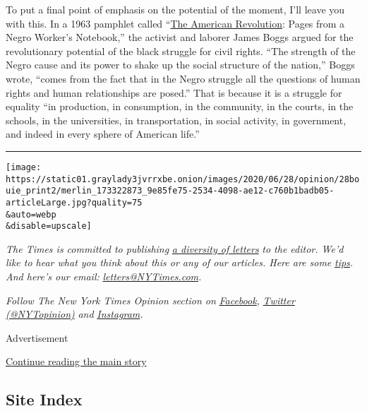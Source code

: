 To put a final point of emphasis on the potential of the moment, I'll
leave you with this. In a 1963 pamphlet called
``\href{https://books.google.com/books/about/The_American_revolution.html?id=p2MOAQAAMAAJ}{The
American Revolution}: Pages from a Negro Worker's Notebook,'' the
activist and laborer James Boggs argued for the revolutionary potential
of the black struggle for civil rights. ``The strength of the Negro
cause and its power to shake up the social structure of the nation,''
Boggs wrote, ``comes from the fact that in the Negro struggle all the
questions of human rights and human relationships are posed.'' That is
because it is a struggle for equality ``in production, in consumption,
in the community, in the courts, in the schools, in the universities, in
transportation, in social activity, in government, and indeed in every
sphere of American life.''

\begin{center}\rule{0.5\linewidth}{\linethickness}\end{center}

\texttt{[image: https://static01.graylady3jvrrxbe.onion/images/2020/06/28/opinion/28bouie\_print2/merlin\_173322873\_9e85fe75-2534-4098-ae12-c760b1badb05-articleLarge.jpg?quality=75\\\&auto=webp\\\&disable=upscale]}

\emph{The Times is committed to publishing}
\href{https://www.nytimes3xbfgragh.onion/2019/01/31/opinion/letters/letters-to-editor-new-york-times-women.html}{\emph{a
diversity of letters}} \emph{to the editor. We'd like to hear what you
think about this or any of our articles. Here are some}
\href{https://help.nytimes3xbfgragh.onion/hc/en-us/articles/115014925288-How-to-submit-a-letter-to-the-editor}{\emph{tips}}\emph{.
And here's our email:}
\href{mailto:letters@NYTimes.com}{\emph{letters@NYTimes.com}}\emph{.}

\emph{Follow The New York Times Opinion section on}
\href{https://www.facebookcorewwwi.onion/nytopinion}{\emph{Facebook}}\emph{,}
\href{http://twitter.com/NYTOpinion}{\emph{Twitter (@NYTopinion)}}
\emph{and}
\href{https://www.instagram.com/nytopinion/}{\emph{Instagram}}\emph{.}

Advertisement

\protect\hyperlink{after-bottom}{Continue reading the main story}

\hypertarget{site-index}{%
\subsection{Site Index}\label{site-index}}

